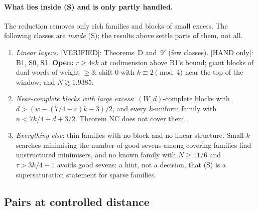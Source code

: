 \documentclass[11pt]{article}
\theoremstyle{definition}
\newcommand{\st}[1]{\textsf{\small[#1]}}
\begin{document}
\paragraph{What lies inside (S) and is only partly handled.} The reduction removes only rich families and blocks of
small excess. The following classes are \emph{inside} (S); the results above settle parts of them, not all.
\begin{enumerate}[leftmargin=*]
\item \emph{Linear layers.} \st{VERIFIED}: Theorems~D and~$9'$ (few classes). \st{HAND only}: B1, S0, S1.
\textbf{Open:} $r\ge4\varepsilon k$ at codimension above B1's bound; giant blocks of dual words of weight $\ge3$; shift
$0$ with $k\equiv2\pmod 4$ near the top of the window; and $N\gtrsim1.9385$.
\item \emph{Near-complete blocks with large excess}: $(W,d)$-complete blocks with $d>(w-(7/4-\varepsilon)k-3)/2$, and
every $k$-uniform family with $n<7k/4+d+3/2$. Theorem NC does not cover them.
\item \emph{Everything else}: thin families with no block and no linear structure. Small-$k$ searches minimising the
number of good sevens among covering families find unstructured minimisers, and no known family with $N\ge11/6$ and
$\tau>3k/4+1$ avoids good sevens: a hint, not a decision, that (S) is a supersaturation statement for sparse families.
\end{enumerate}

\subsection{Pairs at controlled distance}
\end{document}
